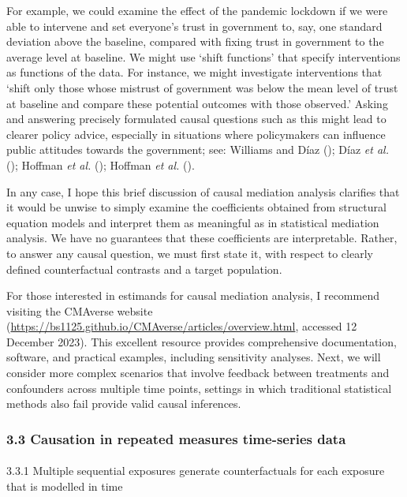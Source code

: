 \documentclass[
  singlecolumn]{article}
\makeatletter
\let\oldparagraph\paragraph
\renewcommand{\paragraph}{
    \@ifstar
      \xxxParagraphStar
      \xxxParagraphNoStar
  }
\newcommand{\xxxParagraphStar}[1]{\oldparagraph*{#1}\mbox{}}
\newcommand{\xxxParagraphNoStar}[1]{\oldparagraph{#1}\mbox{}}
\makeatother
\begin{document}
For example, we could examine the effect of the pandemic lockdown if we
were able to intervene and set everyone's trust in government to, say,
one standard deviation above the baseline, compared with fixing trust in
government to the average level at baseline. We might use `shift
functions' that specify interventions as functions of the data. For
instance, we might investigate interventions that `shift only those
whose mistrust of government was below the mean level of trust at
baseline and compare these potential outcomes with those observed.'
Asking and answering precisely formulated causal questions such as this
might lead to clearer policy advice, especially in situations where
policymakers can influence public attitudes towards the government; see:
Williams and Díaz (); Díaz \emph{et
al.} (); Hoffman \emph{et al.}
(); Hoffman \emph{et al.}
().

In any case, I hope this brief discussion of causal mediation analysis
clarifies that it would be unwise to simply examine the coefficients
obtained from structural equation models and interpret them as
meaningful as in statistical mediation analysis. We have no guarantees
that these coefficients are interpretable. Rather, to answer any causal
question, we must first state it, with respect to clearly defined
counterfactual contrasts and a target population.

For those interested in estimands for causal mediation analysis, I
recommend visiting the CMAverse website
(\url{https://bs1125.github.io/CMAverse/articles/overview.html},
accessed 12 December 2023). This excellent resource provides
comprehensive documentation, software, and practical examples, including
sensitivity analyses. Next, we will consider more complex scenarios that
involve feedback between treatments and confounders across multiple time
points, settings in which traditional statistical methods also fail
provide valid causal inferences.

\subsubsection{3.3 Causation in repeated measures time-series
data}\label{causation-in-repeated-measures-time-series-data}

\paragraph{3.3.1 Multiple sequential exposures generate counterfactuals
for each exposure that is modelled in
time}\label{multiple-sequential-exposures-generate-counterfactuals-for-each-exposure-that-is-modelled-in-time}
\end{document}
